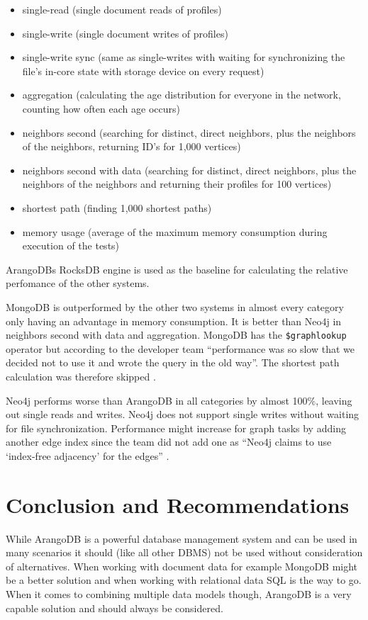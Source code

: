 \begin{itemize}
  \item single-read (single document reads of profiles)
  \item single-write (single document writes of profiles)
  \item single-write sync (same as single-writes with waiting for synchronizing the file's in-core state with storage device on every request)
  \item aggregation (calculating the age distribution for everyone in the network, counting how often each age occurs)
  \item neighbors second (searching for distinct, direct neighbors, plus the neighbors of the neighbors, returning ID’s for 1,000 vertices)
  \item neighbors second with data (searching for distinct, direct neighbors, plus the neighbors of the neighbors and returning their profiles for 100 vertices)
  \item shortest path (finding 1,000 shortest paths)
  \item memory usage (average of the maximum memory consumption during execution of the tests)
\end{itemize}

ArangoDBs RocksDB engine is used as the baseline for calculating the relative perfomance of the other systems.

MongoDB is outperformed by the other two systems in almost every category only having an advantage in memory consumption. It is better than Neo4j in neighbors second with data and aggregation. MongoDB has the \texttt{\$graphlookup} operator but according to the developer team ``performance was so slow that we decided not to use it and wrote the query in the old way''. The shortest path calculation was therefore skipped \parencite{DBBenchmark}.

Neo4j performs worse than ArangoDB in all categories by almost 100\%, leaving out single reads and writes. Neo4j does not support single writes without waiting for file synchronization. Performance might increase for graph tasks by adding another edge index since the team did not add one as ``Neo4j claims to use `index-free adjacency' for the edges'' \parencite{DBBenchmark}.

\section{Conclusion and Recommendations}
While ArangoDB is a powerful database management system and can be used in many scenarios it should (like all other DBMS) not be used without consideration of alternatives. When working with document data for example MongoDB might be a better solution and when working with relational data SQL is the way to go. When it comes to combining multiple data models though, ArangoDB is a very capable solution and should always be considered.
